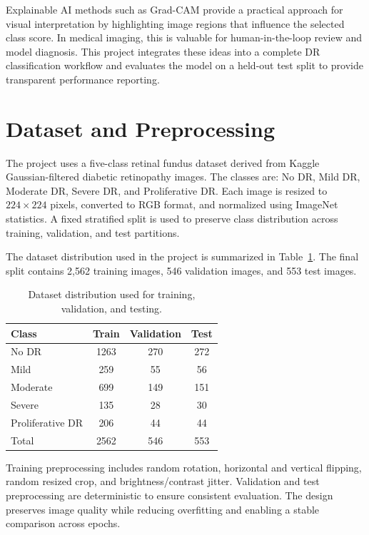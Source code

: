\documentclass[conference]{IEEEtran}
\begin{document}
Explainable AI methods such as Grad-CAM provide a practical approach for visual interpretation by highlighting image regions that influence the selected class score. In medical imaging, this is valuable for human-in-the-loop review and model diagnosis. This project integrates these ideas into a complete DR classification workflow and evaluates the model on a held-out test split to provide transparent performance reporting.

\section{Dataset and Preprocessing}
The project uses a five-class retinal fundus dataset derived from Kaggle Gaussian-filtered diabetic retinopathy images. The classes are: No DR, Mild DR, Moderate DR, Severe DR, and Proliferative DR. Each image is resized to $224 \times 224$ pixels, converted to RGB format, and normalized using ImageNet statistics. A fixed stratified split is used to preserve class distribution across training, validation, and test partitions.

The dataset distribution used in the project is summarized in Table~\ref{tab:data}. The final split contains 2,562 training images, 546 validation images, and 553 test images.

\begin{table}[t]
\centering
\caption{Dataset distribution used for training, validation, and testing.}
\label{tab:data}
\begin{tabular}{lccc}
\toprule
Class & Train & Validation & Test \\
\midrule
No DR & 1263 & 270 & 272 \\
Mild & 259 & 55 & 56 \\
Moderate & 699 & 149 & 151 \\
Severe & 135 & 28 & 30 \\
Proliferative DR & 206 & 44 & 44 \\
\midrule
Total & 2562 & 546 & 553 \\
\bottomrule
\end{tabular}
\end{table}

Training preprocessing includes random rotation, horizontal and vertical flipping, random resized crop, and brightness/contrast jitter. Validation and test preprocessing are deterministic to ensure consistent evaluation. The design preserves image quality while reducing overfitting and enabling a stable comparison across epochs.
\end{document}

